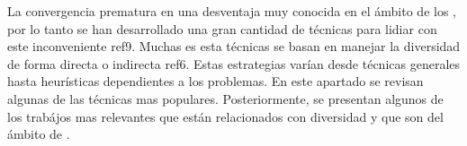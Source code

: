 



La convergencia prematura en una desventaja muy conocida en el ámbito de los \EAS{}, por lo tanto se han desarrollado una gran cantidad de técnicas para lidiar con este inconveniente ref9.
%
Muchas es esta técnicas se basan en manejar la diversidad de forma directa o indirecta ref6.
%
Estas estrategias varían desde técnicas generales hasta heurísticas dependientes a los problemas.
%
En este apartado se revisan algunas de las técnicas mas populares.
%
Posteriormente, se presentan algunos de los trabájos mas relevantes que están relacionados con diversidad y que son del ámbito de \DE{}.
